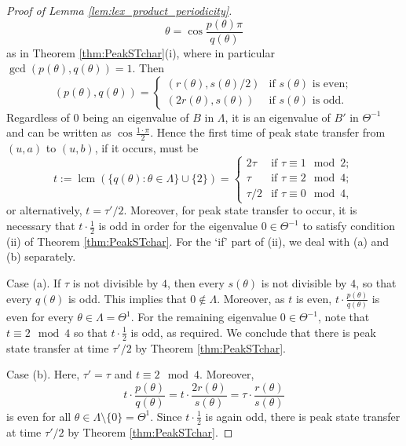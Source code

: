\documentclass{article}
\numberwithin{equation}{section}
\DeclareMathOperator{\lcm}{lcm}
\begin{document}
\begin{proof}[Proof of Lemma \ref{lem:lex_product_periodicity}]
\[
\theta = \cos \frac{p(\theta)\pi}{q(\theta)}
\]
as in Theorem \ref{thm:PeakSTchar}(i), where in particular $\gcd(p(\theta),q(\theta)) = 1$. Then
\[
(p(\theta),q(\theta)) = \begin{cases}
(r(\theta),s(\theta)/2) &\text{if $s(\theta)$ is even}; \\
(2r(\theta),s(\theta)) &\text{if $s(\theta)$ is odd.}
\end{cases}
\]
Regardless of $0$ being an eigenvalue of $B$ in $\Lambda$, it is an eigenvalue of $B'$ in $\Theta^{-1}$ and can be written as $\cos\frac{1 \cdot \pi}{2}$. Hence the first time of peak state transfer from $(u,a)$ to $(u,b)$, if it occurs, must be
\[
t := \lcm(\{q(\theta) : \theta \in \Lambda\} \cup \{2\}) = \begin{cases}
2\tau &\text{if $\tau \equiv 1 \mod 2$}; \\
\tau &\text{if $\tau \equiv 2 \mod 4$}; \\
\tau/2 &\text{if $\tau \equiv 0 \mod 4$},
\end{cases}
\]
or alternatively, $t = \tau'/2$. Moreover, for peak state transfer to occur, it is necessary that $t\cdot \frac{1}{2}$ is odd in order for the eigenvalue $0 \in \Theta^{-1}$ to satisfy condition (ii) of Theorem \ref{thm:PeakSTchar}. For the `if' part of (ii), we deal with (a) and (b) separately.

Case (a). If $\tau$ is not divisible by $4$, then every $s(\theta)$ is not divisible by $4$, so that every $q(\theta)$ is odd. This implies that $0 \notin \Lambda$. Moreover, as $t$ is even, $t \cdot \frac{p(\theta)}{q(\theta)}$ is even for every $\theta \in \Lambda = \Theta^1$. 
For the remaining eigenvalue $0 \in \Theta^{-1}$, note that $t \equiv 2 \mod 4$ so that $t \cdot \frac{1}{2}$ is odd, as required. We conclude that there is peak state transfer at time $\tau'/2$ by Theorem \ref{thm:PeakSTchar}.

Case (b). Here, $\tau' = \tau$ and $t \equiv 2 \mod 4$. Moreover,
\begin{equation}
\label{eq:peak_st_condition_odd}
t \cdot \frac{p(\theta)}{q(\theta)} = t \cdot \frac{2r(\theta)}{s(\theta)} = \tau \cdot \frac{r(\theta)}{s(\theta)}
\end{equation}
is even for all $\theta \in \Lambda \setminus \{0\} = \Theta^1$. Since $t\cdot \frac{1}{2}$ is again odd, there is peak state transfer at time $\tau'/2$ by Theorem \ref{thm:PeakSTchar}.


\end{proof}
\end{document}
